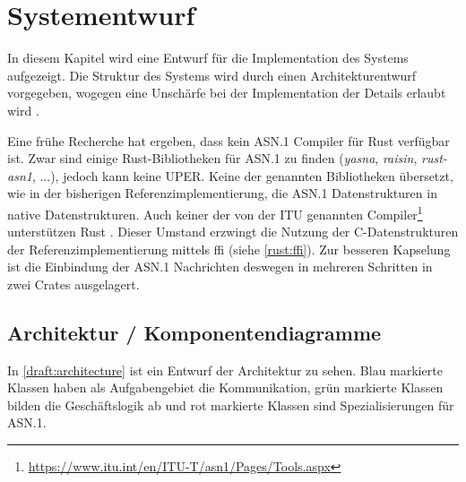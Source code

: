 
\chapter{Systementwurf}

In diesem Kapitel wird eine Entwurf für die Implementation des Systems aufgezeigt.
Die Struktur des Systems wird durch einen Architekturentwurf vorgegeben, wogegen eine Unschärfe bei der Implementation der Details erlaubt wird .

Eine frühe Recherche hat ergeben, dass kein ASN.1 Compiler für Rust verfügbar ist.
Zwar sind einige Rust-Bibliotheken für ASN.1 zu finden (\textit{yasna}, \textit{raisin}, \textit{rust-asn1}, ...), jedoch kann keine UPER.
Keine der genannten Bibliotheken übersetzt, wie in der bisherigen Referenzimplementierung, die ASN.1 Datenstrukturen in native Datenstrukturen.
Auch keiner der von der ITU genannten Compiler\footnote{\url{https://www.itu.int/en/ITU-T/asn1/Pages/Tools.aspx}} unterstützen Rust .
Dieser Umstand erzwingt die Nutzung der C-Datenstrukturen der Referenzimplementierung mittels \gls{ffi} (siehe \autoref{rust:ffi}).
Zur besseren Kapselung ist die Einbindung der ASN.1 Nachrichten deswegen in mehreren Schritten in zwei Crates ausgelagert.


\section{Architektur / Komponentendiagramme}
		
In \autoref{draft:architecture} ist ein Entwurf der Architektur zu sehen.
Blau markierte Klassen haben als Aufgabengebiet die Kommunikation, grün markierte Klassen bilden die Geschäftslogik ab und rot markierte Klassen sind Spezialisierungen für ASN.1.


